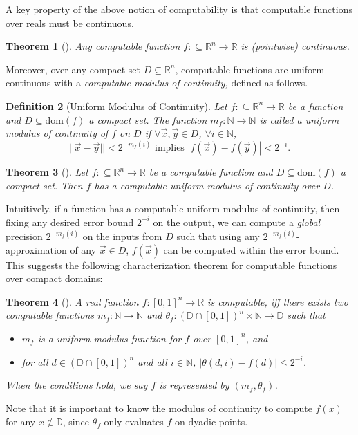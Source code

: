 \documentclass[conference]{IEEEtran}
\newtheorem{theorem}{Theorem}
\newtheorem{definition}[theorem]{Definition}
\newcommand{\dom}{\mathrm{dom}}
\begin{document}
A key property of the above notion of computability is that computable functions over reals must be continuous.
\begin{theorem}[\cite{CAbook}]
Any computable function $f:\subseteq \mathbb{R}^n\rightarrow \mathbb{R}$ is (pointwise) continuous.
\end{theorem}

Moreover, over any compact set $D\subseteq \mathbb{R}^n$, computable functions are uniform continuous with a {\em computable modulus of continuity,} defined as follows. 

\begin{definition}[Uniform Modulus of Continuity]
Let $f:\subseteq \mathbb{R}^n\rightarrow \mathbb{R}$ be a function and $D\subseteq\dom(f)$ a compact set. The function $m_f: \mathbb{N}\rightarrow \mathbb{N}$ is called a uniform modulus of continuity of $f$ on $D$ if $\forall \vec x,\vec y\in D$, $\forall i\in \mathbb{N}$,
$$||\vec x-\vec y||<2^{-m_f(i)}\mbox{ implies }|f(\vec x)-f(\vec y)|<2^{-i}.$$
\end{definition}

\begin{theorem}[\cite{CAbook}]
Let $f:\subseteq\mathbb{R}^n\rightarrow \mathbb{R}$ be a computable function and $D\subseteq\dom(f)$ a compact set. Then $f$ has a computable uniform modulus of continuity over $D$.
\end{theorem}
Intuitively, if a function has a computable uniform modulus of continuity, then fixing any desired error bound $2^{-i}$ on the output, we can compute a {\em global} precision $2^{-m_f(i)}$ on the inputs from $D$ such that using any $2^{-m_f(i)}$-approximation of any $\vec x\in D$, $f(\vec x)$ can be computed within the error bound. This suggests the following characterization theorem for computable functions over compact domains:
\begin{theorem}[\cite{Kobook}]
\label{ch}
A real function $f: [0,1]^n\rightarrow \mathbb{R}$ is computable, iff there exists two computable functions $m_f:\mathbb{N}\rightarrow \mathbb{N}$ and $\theta_f: (\mathbb{D}\cap [0,1])^n\times \mathbb{N}\rightarrow \mathbb{D}$ such that
\begin{itemize}
\item $m_f$ is a uniform modulus function for $f$ over $[0,1]^n$, and
\item for all $d\in (\mathbb{D}\cap [0,1])^n$ and all $i\in \mathbb{N}$, $|\theta(d, i)- f(d)|\leq 2^{-i}$. 
\end{itemize}
When the conditions hold, we say $f$ is {\em represented} by $(m_f,\theta_f)$. 
\end{theorem}
Note that it is important to know the modulus of continuity to compute $f(x)$ for any $x\not\in \mathbb{D}$, since $\theta_f$ only evaluates $f$ on dyadic points.
\end{document}
